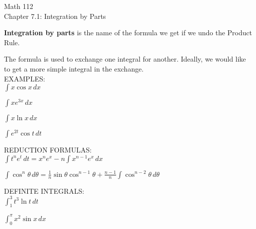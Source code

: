 \documentclass[11pt]{article}
\begin{document}
\begin{center}
\Large
\rm{Math 112}
\\
\rm{Chapter 7.1:  Integration by Parts}
\\
\end{center}
\vspace{0.2in}

{\bf Integration by parts} is the name of the formula we get if we undo the Product Rule.\\


\vspace{3.5in}


The formula is used to exchange one integral for another.  Ideally, we would like to get a more simple integral in
the exchange.\\

EXAMPLES: \\


$\int x\cos{x} \, dx$

\vspace{1.5in}

$\int xe^{3x}\, dx$


\vspace{2in}


\pagebreak

$\int x\ln{x} \, dx$


\vspace{1.5in}

$\int e^{2t}\cos{t} \, dt$


\vspace{2.5in}

REDUCTION FORMULAS:\\

$\int t^ne^{t} \, dt = x^ne^x - n\int x^{n-1}e^x \, dx$


\vspace{3in}

\pagebreak

$\int \cos^n{\theta} \, d\theta = \frac{1}{n}\sin{\theta}\cos^{n-1}{\theta} + \frac{n-1}{n}\int \cos^{n-2}{\theta} \, d\theta$


\vspace{3.5in}


DEFINITE INTEGRALS:\\

$\int_1^{3} t^3\ln{t} \, dt$

    \vspace{1.5in}

$\int_0^{\pi} x^2\sin{x} \, dx$

    \vspace{2in}
\end{document}
